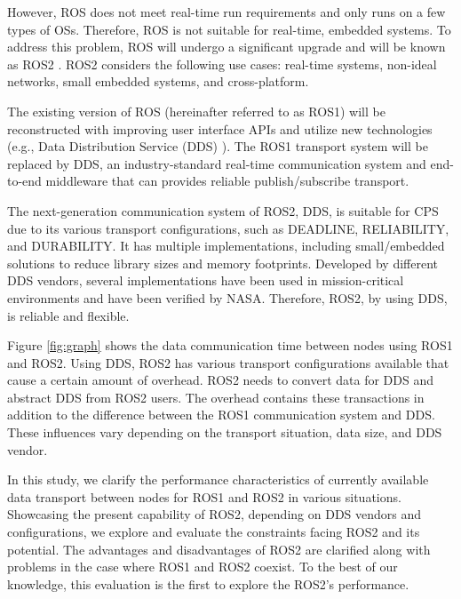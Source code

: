 \documentclass{sig-alternate-ipsn13}
\begin{document}
However, ROS does not meet real-time run requirements and only runs on a few types of OSs. Therefore, ROS is not suitable for real-time, embedded systems. To address this problem, ROS will undergo a significant upgrade and will be known as ROS2 \cite{ros2_iccps2016}. ROS2 considers the following use cases: real-time systems, non-ideal networks, small embedded systems, and cross-platform.

The existing version of ROS (hereinafter referred to as ROS1) will be reconstructed with improving user interface APIs and utilize new technologies (e.g., Data Distribution Service (DDS) \cite{pardo2003omg}). The ROS1 transport system will be replaced by DDS, an industry-standard real-time communication system and end-to-end middleware that can provides reliable publish/subscribe transport.

The next-generation communication system of ROS2, DDS, is suitable for CPS due to its various transport configurations, such as DEADLINE, RELIABILITY, and DURABILITY. It has multiple implementations, including small/embedded solutions to reduce library sizes and memory footprints. Developed by different DDS vendors, several implementations have been used in mission-critical environments and have been verified by NASA. Therefore, ROS2, by using DDS, is reliable and flexible.

Figure \ref{fig:graph} shows the data communication time between nodes using ROS1 and ROS2. Using DDS, ROS2 has various transport configurations available that cause a certain amount of overhead. ROS2 needs to convert data for DDS and abstract DDS from ROS2 users. The overhead contains these transactions in addition to the difference between the ROS1 communication system and DDS. These influences vary depending on the transport situation, data size, and DDS vendor.

In this study, we clarify the performance characteristics of currently available data transport between nodes for ROS1 and ROS2 in various situations. Showcasing the present capability of ROS2, depending on DDS vendors and configurations, we explore and evaluate the constraints facing ROS2 and its potential. The advantages and disadvantages of ROS2 are clarified along with problems in the case where ROS1 and ROS2 coexist. To the best of our knowledge, this evaluation is the first to explore the ROS2's performance.

\end{document}
